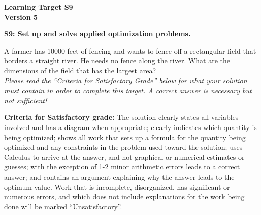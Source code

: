 \documentclass[10pt]{article}
\begin{document}
	\vspace*{0in}

		\begin{center}
			\textbf{Learning Target S9 \\
			Version 5} 
		\end{center}


\begin{framed}
	\textbf{S9: Set up and solve applied optimization problems.}
\end{framed}

A farmer has 10000 feet of fencing and wants to fence off a rectangular field that borders a straight river. He needs no fence along the river. What are the dimensions of the field that has the largest area?  \\

\emph{Please read the ``Criteria for Satisfactory Grade'' below for what your solution must contain in order to complete this target. A correct answer is necessary but not sufficient!} 




\vfill

\begin{small}
    \begin{framed}
        	\textbf{Criteria for Satisfactory grade:} The solution clearly states all variables involved and has a diagram when appropriate; clearly indicates which quantity is being optimized; shows all work that sets up a formula for the quantity being optimized and any constraints in the problem used toward the solution; uses Calculus to arrive at the answer, and not graphical or numerical estimates or guesses; with the exception of 1-2 minor arithmetic errors leads to a correct answer; and contains an argument explaining why the answer leads to the optimum value. Work that is incomplete, disorganized, has significant or numerous errors, and which does not include explanations for the work being done will be marked ``Unsatisfactory''. 
    \end{framed}

\end{small}
\end{document}
